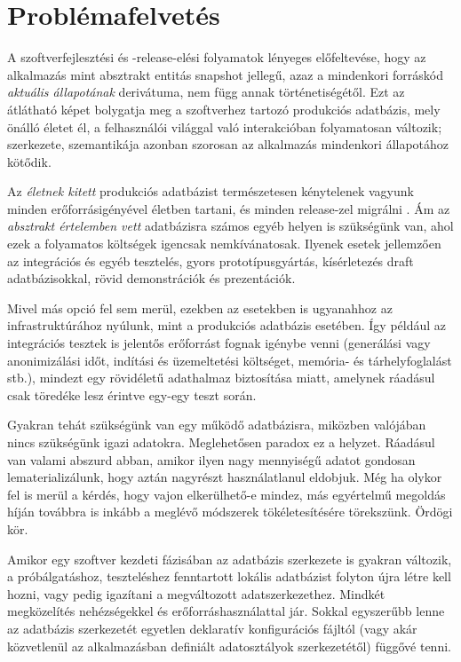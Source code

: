 \documentclass[
    parspace,
    noindent,
    nohyp,
]{elteiktdk}[2023/04/10]
\newcommand{\todoref}[1]{\todo[inline, noinlinepar, color=red, textcolor=white, inlinewidth=0.6cm, caption={#1}]{\large \textbf{×}}}
\begin{document}
\section{Problémafelvetés}

A szoftverfejlesztési és -release-elési folyamatok lényeges előfeltevése,
hogy az alkalmazás mint absztrakt entitás snapshot jellegű,
azaz a mindenkori forráskód \textit{aktuális állapotának} derivátuma,
nem függ annak történetiségétől.
Ezt az átlátható képet bolygatja meg a szoftverhez tartozó produkciós adatbázis,
mely önálló életet él, a felhasználói világgal való interakcióban folyamatosan változik;
szerkezete, szemantikája azonban szorosan az alkalmazás mindenkori állapotához kötődik.%
\cite{Ploski2007DatabaseCentricVersioning,Fluri2023DatabaseCiCd,Edwards2023LiveLocalSchemaChange}

Az \textit{életnek kitett} produkciós adatbázist természetesen kénytelenek vagyunk
minden erőforrásigényével életben tartani, és minden release-zel migrálni \todoref{+CITE: DB-migráció (Flyway/Liquibase...?)}.
Ám az \textit{absztrakt értelemben vett} adatbázisra számos egyéb helyen is szükségünk van,
ahol ezek a folyamatos költségek igencsak nemkívánatosak.
Ilyenek esetek jellemzően az integrációs és egyéb tesztelés, gyors prototípusgyártás, kísérletezés draft adatbázisokkal, rövid demonstrációk és prezentációk.

Mivel más opció fel sem merül, ezekben az esetekben is ugyanahhoz az infrastruktúrához nyúlunk,
mint a produkciós adatbázis esetében.
Így például az integrációs tesztek is jelentős erőforrást fognak igénybe venni
(generálási vagy anonimizálási időt, indítási  és üzemeltetési költséget, memória- és tárhelyfoglalást stb.),
mindezt egy rövidéletű adathalmaz biztosítása miatt,
amelynek ráadásul csak töredéke lesz érintve egy-egy teszt során.

Gyakran tehát szükségünk van egy működő adatbázisra,
miközben valójában nincs szükségünk igazi adatokra.
Meglehetősen paradox ez a helyzet.
Ráadásul van valami abszurd abban, amikor ilyen nagy mennyiségű adatot
gondosan lematerializálunk, hogy aztán nagyrészt használatlanul eldobjuk.
Még ha olykor fel is merül a kérdés, hogy vajon elkerülhető-e mindez,
más egyértelmű megoldás híján továbbra is inkább a meglévő módszerek tökéletesítésére törekszünk.
Ördögi kör.

Amikor egy szoftver kezdeti fázisában az adatbázis szerkezete is gyakran változik,
a próbálgatáshoz, teszteléshez fenntartott lokális adatbázist folyton újra létre kell hozni,
vagy pedig igazítani a megváltozott adatszerkezethez.
Mindkét megközelítés nehézségekkel és erőforráshasználattal jár.
Sokkal egyszerűbb lenne az adatbázis szerkezetét egyetlen deklaratív konfigurációs fájltól
(vagy akár közvetlenül az alkalmazásban definiált adatosztályok szerkezetétől) függővé tenni.
\end{document}
